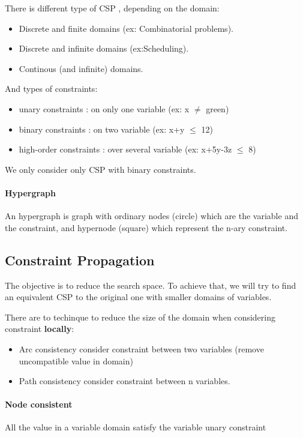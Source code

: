 	There is different type of CSP , depending on the domain:
	\begin{itemize}
		\item Discrete and finite domains (ex: Combinatorial problems).
		\item Discrete and infinite domains (ex:Scheduling).
		\item Continous (and infinite) domains.
	\end{itemize}
	And types of constraints:
	\begin{itemize}
		\item unary constraints : on only one variable (ex: x $\neq$ green)
		\item binary constraints : on two variable (ex: x+y $\leq$ 12)
		\item high-order constraints : over several variable (ex: x+5y-3z $\leq$ 8)
	\end{itemize}
	We only consider only CSP with binary constraints.

 \paragraph{Hypergraph}   An   hypergraph   is   graph   with   ordinary
 nodes (circle)  which   are  the   variable  and  the   constraint,  and
 hypernode (square) which represent the n-ary constraint.

\subsection{Constraint Propagation}

The objective  is to reduce the  search space. To achieve  that, we will
try to find  an equivalent CSP to the original  one with smaller domains
of variables.

There are to techinque to reduce the size of the domain when considering
constraint \textbf{locally}:
\begin{itemize}
    \item  Arc  consistency  consider  constraint  between  two  variables
      (remove uncompatible value in domain)
    \item Path consistency consider constraint between n variables.
\end{itemize}

\paragraph{Node consistent} All  the value in a  variable domain satisfy
the variable unary constraint

